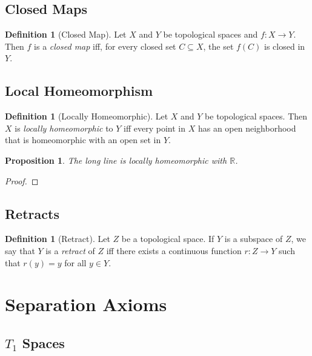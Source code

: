 \documentclass{report}
\let\qed\relax
\newtheorem{prop}[lm]{Proposition}
\theoremstyle{definition}
\newtheorem{df}[lm]{Definition}
\begin{document}
  \section{Closed Maps}

  \begin{df}[Closed Map]
    Let $X$ and $Y$ be topological spaces and $f : X \rightarrow Y$. Then $f$
    is
    a \emph{closed map} iff, for every closed set $C \subseteq X$, the
    set $f(C)$ is closed in $Y$.
  \end{df}

  \section{Local Homeomorphism}

  \begin{df}[Locally Homeomorphic]
    Let $X$ and $Y$ be topological spaces. Then $X$ is \emph{locally
      homeomorphic} to $Y$ iff every point in $X$ has an open neighborhood that
    is homeomorphic with an open set in $Y$.
  \end{df}

  \begin{prop}
    The long line is locally homeomorphic with $\mathbb{R}$.
  \end{prop}

  \begin{proof}
    \pf
    \qed
  \end{proof}

  \section{Retracts}

   \begin{df}[Retract]
  Let $Z$ be a topological space. If $Y$ is a subspace of $Z$, we say that $Y$
  is a \emph{retract} of $Z$ iff there exists a continuous function $r : Z
\rightarrow Y$ such that $r(y) = y$ for all $y \in Y$.
 \end{df}

  \chapter{Separation Axioms}

  \section{$T_1$ Spaces}
\end{document}
